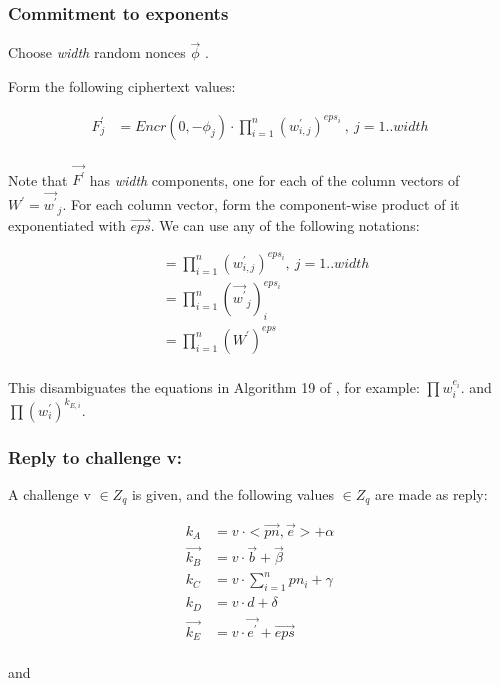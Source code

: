 \documentclass{article}
\begin{document}
\subsubsection*{Commitment to exponents}

Choose \emph{width} random nonces $\vec{\phi}$ .

Form the following ciphertext values:

\begin{align*}
F_{j}^{\prime} & =Encr(0,-{\phi_{j}})\cdot\prod_{i=1}^{n}(w_{i,j}^{\prime})^{eps_{i}}\ ,\ j=1..width\\
\end{align*}

Note that $\vec{F^{\prime}}$ has \emph{width} components, one for
each of the column vectors of $W^{\prime}=\vec{w^{\prime}}_{j}$.
For each column vector, form the component-wise product of it exponentiated
with $\vec{eps}$. We can use any of the following notations:

\begin{align*}
 & =\prod_{i=1}^{n}(w_{i,j}^{\prime})^{eps_{i}},\ j=1..width\\
 & =\prod_{i=1}^{n}(\vec{w^{\prime}}_{j})_{i}^{eps_{i}}\\
 & =\prod_{i=1}^{n}(W^{\prime})^{eps}\\
\end{align*}

This disambiguates the equations in Algorithm 19 of \cite{Wikstr22}, for example:
$\prod w_{i}^{e_{i}}$. and $\prod(w_{i}^{\prime})^{k_{E,i}}$.

\subsubsection{Reply to challenge v:}

A challenge v $\in Z_{q}$ is given, and the following values $\in Z_{q}$
are made as reply:

\begin{align*}
k_{A} & =v\ \cdot<\vec{pn},\vec{e}>+\alpha\\
\vec{k_{B}} & =v\cdot\vec{b}+\vec{\beta}\\
k_{C} & =v\cdot\sum_{i=1}^{n}pn_{i}+\gamma\\
k_{D} & =v\cdot d+\delta\\
\vec{k_{E}} & =v\cdot\vec{e^{\prime}}+\vec{eps}\\
\end{align*}

and
\end{document}
